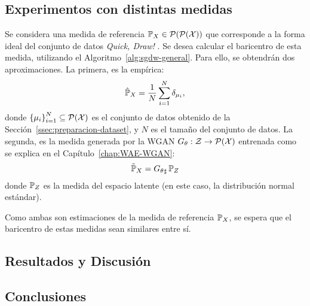 
\subsection{Experimentos con distintas medidas}\label{ssec:muestreando-gamma}  %


Se considera una medida de referencia $\Prob_X \in \ProbSpace[\ProbSpace[\cX]]$ que corresponde a la forma ideal del conjunto de datos \textit{Quick, Draw!} \cite{jongejan2016quick}. Se desea calcular el baricentro de esta medida, utilizando el Algoritmo~\ref{alg:sgdw-general}. Para ello, se obtendrán dos aproximaciones. La primera, es la empírica:
\begin{equation}
    \hat \Prob_X = \frac{1}{N} \sum_{i=1}^{N} \delta_{\mu_i},
\end{equation}
donde $\left\{ \mu_i \right\}_{i=1}^{N} \subseteq \ProbSpace[\cX] $ es el conjunto de datos obtenido de la Sección~\ref{ssec:preparacion-dataset}, y $N$ es el tamaño del conjunto de datos. La segunda, es la medida generada por la WGAN $G_\theta : \cZ \to \ProbSpace[\cX] $ entrenada como se explica en el Capítulo~\ref{chap:WAE-WGAN}:
\begin{equation}
    \tilde \Prob_X
    = \pf{G_\theta} \Prob_Z
\end{equation}
donde $\Prob_Z$ es la medida del espacio latente (en este caso, la distribución normal estándar).

Como ambas son estimaciones de la medida de referencia $\Prob_X$, se espera que el baricentro de estas medidas sean similares entre sí.

\subsection{Resultados y Discusión}\label{ssec:sgdw-resultados-discusion}  %


\subsection{Conclusiones}\label{ssec:sgdw-conclusiones}  %



